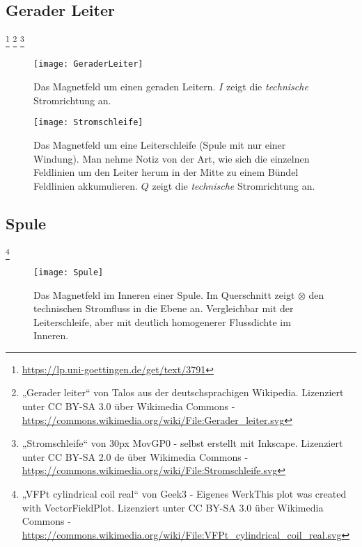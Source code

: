 \subsection{Gerader Leiter} 
\footnote{\url{https://lp.uni-goettingen.de/get/text/3791}} 
\footnote{„Gerader leiter“ von Talos aus der deutschsprachigen Wikipedia. Lizenziert unter CC BY-SA 3.0 über Wikimedia Commons - \url{https://commons.wikimedia.org/wiki/File:Gerader_leiter.svg}} 
\footnote{„Stromschleife“ von 30px MovGP0 - selbst erstellt mit Inkscape. Lizenziert unter CC BY-SA 2.0 de über Wikimedia Commons - \url{https://commons.wikimedia.org/wiki/File:Stromschleife.svg}} 
\label{subsec:GeraderLeiterFeld}

\hfill

\begin{figure}[ht!]
	\centering
	\begin{minipage}[b]{0.4\linewidth}
   	\texttt{[image: GeraderLeiter]}
		\caption{Das Magnetfeld um einen geraden Leitern. $I$ zeigt die \emph{technische} Stromrichtung an.}
	\end{minipage}
	\quad
	\begin{minipage}[b]{0.4\linewidth}
    	\texttt{[image: Stromschleife]}
	\caption{Das Magnetfeld um eine Leiterschleife (Spule mit nur einer Windung). Man nehme Notiz von der Art, wie sich die einzelnen Feldlinien um den Leiter herum in der Mitte zu einem Bündel Feldlinien akkumulieren. $Q$ zeigt die \emph{technische} Stromrichtung an.}
	\end{minipage}
\end{figure}

\newpage
\subsection{Spule}	
\footnote{„VFPt cylindrical coil real“ von Geek3 - Eigenes WerkThis plot was created with VectorFieldPlot. Lizenziert unter CC BY-SA 3.0 über Wikimedia Commons - \url{https://commons.wikimedia.org/wiki/File:VFPt_cylindrical_coil_real.svg}}
\label{subsec:Spule}

\hfill

\begin{figure}[ht!]
	\centering
   	\texttt{[image: Spule]}
		\caption{Das Magnetfeld im Inneren einer Spule. Im Querschnitt zeigt $\otimes$ den technischen Stromfluss in die Ebene an. Vergleichbar mit der Leiterschleife, aber mit deutlich homogenerer Flussdichte im Inneren.}
\end{figure}



